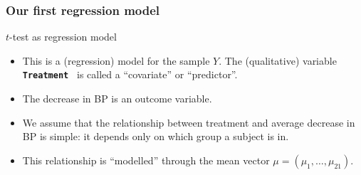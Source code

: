 \documentclass[handout]{beamer}
\newcommand{\Rscode}[1]{{\small \bf \tt #1 }}
\begin{document}
   \begin{frame} \frametitle{Our first regression model}

   \begin{block}
    {$t$-test as regression model}
   \begin{itemize}
   \item This is a (regression) model for the sample $Y$. The
   (qualitative) variable \Rscode{Treatment} is
   called a ``covariate'' or ``predictor''.
   \item The decrease in BP is an outcome variable.
   \item We assume that the relationship between treatment and average
   decrease in BP is simple: it depends only on which group a subject is in.
   \item This relationship is ``modelled'' through the mean
   vector $\mu=(\mu_1, \dots, \mu_{21})$.
   \end{itemize}
   \end{block}
   \end{frame}


   \begin{frame} 

   \end{frame}

   
\end{document}
